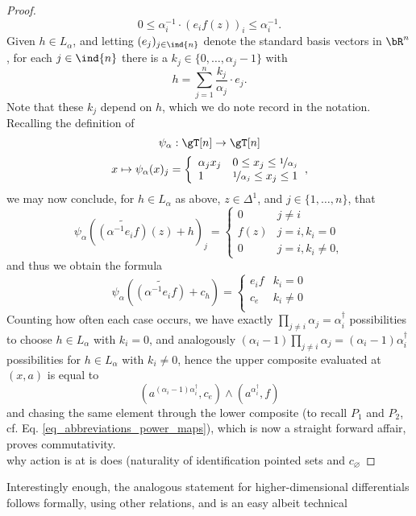 \begin{proof}
	\[ 0 \leq \alpha_i^{-1} \cdot (e_i f (z))_i \leq \alpha_i^{-1}. \]%
Given $h \in L_\alpha$, and letting $(e_j)_{j \in \ind{n}}$ denote the standard basis vectors in $\bR^n$, for each ${j \in \ind{n}}$ there is a $k_j \in \{0, \ldots, \alpha_j -1\}$ with
	\[ h = \sum_{j=1}^n \frac{k_j}{\alpha_j} \cdot e_j. \]
Note that these $k_j$ depend on $h$, which we do note record in the notation.%
Recalling the definition of
	\[	\psi_\alpha: \gT[n] \to \gT[n] \]
	\[ x \mapsto \psi_\alpha(x)_j = %
		{\left\{
			\begin{array}{ll}
				\alpha_j x_j & 0 \leq x_j \leq \nicefrac{1}{\alpha_j} \\
				1 & \nicefrac{1}{\alpha_j} \leq x_j \leq 1
			\end{array}
		\right.},%
	\]
we may now conclude, for $h \in L_\alpha$ as above, $z \in \Delta^1$, and $j \in \{1,\ldots,n\}$, that
	\[	\psi_\alpha( \widetilde{(\alpha^{-1} e_i f)}(z) + h )_j = %
		{\left\{
			\begin{array}{ll}
				0 & j \neq i\\
        f(z) & j = i, k_i = 0\\
				0 & j=i, k_i \neq 0,
			\end{array}
		\right.}
	\]
and thus we obtain the formula
  \[
    \psi_\alpha( \widetilde{(\alpha^{-1} e_i f)} + c_h ) = %
    {\left\{
      \begin{array}{ll}
        e_i f & k_i = 0\\
        c_e & k_i \neq 0\\
      \end{array}
    \right.}
  \]
Counting how often each case occurs, we have exactly $\prod_{j \neq i} \alpha_j = \alpha^\dagger_i$ possibilities to choose $h \in L_\alpha$ with $k_i = 0$, and analogously $(\alpha_i - 1) \prod_{j \neq i} \alpha_j = (\alpha_i - 1) \alpha^\dagger_i$ possibilities for $h \in L_\alpha$ with $k_i \neq 0$, hence the upper composite evaluated at $(x,a)$ is equal to
  \[ (a^{(\alpha_i - 1) \alpha^\dagger_i},c_e) \wedge (a^{\alpha^\dagger_i},f) \]
and chasing the same element through the lower composite (to recall $P_1$ and $P_2$, cf. Eq. \ref{eq_abbreviations_power_maps}), which is now a straight forward affair, proves commutativity.\\
 why action is at is does (naturality of identification pointed sets and $c_\varnothing$
\end{proof}
Interestingly enough, the analogous statement for higher-dimensional differentials follows formally, using other relations, and is an easy albeit technical
